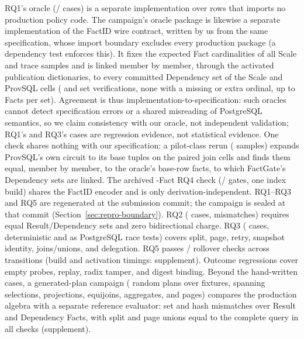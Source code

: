 \documentclass[10pt,journal,compsoc]{IEEEtran}
\newcommand{\system}{FactGate\xspace}
\begin{document}
RQ1's oracle (\RQOnePassed{}/\RQOneCases{} cases) is a separate
implementation over \RQOneRows{} rows that imports no production policy
code. The campaign's oracle package is likewise a separate implementation
of the FactID wire contract, written by us from the same specification,
whose import boundary excludes every production package (a dependency test
enforces this). It fixes the expected Fact cardinalities of all
\FinalVFivePublicationIndependentOracleSamples{} Scale and trace samples
and is linked member by member, through the activated publication
dictionaries, to every committed Dependency set of the Scale and ProvSQL
cells (\FinalVFivePublicationScaleDependencyLinksVerified{} and
\FinalVFivePublicationProvSQLDependencyLinksVerified{} set verifications,
none with a missing or extra ordinal, up to
\FinalVFivePublicationScaleDependencyLinkMaxFacts{} Facts per set).
Agreement is thus implementation-to-specification: such oracles cannot
detect specification errors or a shared misreading of PostgreSQL
semantics, so we claim consistency with our oracle, not independent
validation; RQ1's \RQOneCases{} and RQ3's
\RQThreeCases{} cases are regression evidence, not statistical evidence.
One check shares nothing with our specification: a pilot-class rerun
(\FinalVFiveProvSQLLeafSamples{} samples) expands ProvSQL's own circuit
to its base tuples on the paired join cells and finds them equal, member
by member, to the oracle's \FinalVFiveProvSQLLeafTotalRowFacts{} base-row
facts, to which \system's Dependency sets are linked.
The archived \RQFourVFourOracleFacts{}-Fact RQ4 check
(\RQFourVFourGatesPassed{}/\RQFourVFourGatesTotal{} gates, one index build)
shares the FactID encoder and is only derivation-independent. RQ1--RQ3
and RQ5 are regenerated at the submission commit; the campaign is sealed at
that commit (Section~\ref{sec:repro-boundary}). RQ2
(\RQTwoExposureCases{} cases, \RQTwoExposureMismatches{} mismatches)
requires equal Result/Dependency sets and zero bidirectional charge. RQ3
(\RQThreeCases{} cases, deterministic and as PostgreSQL race tests) covers
split, page, retry, snapshot identity, joins/unions, and delegation.
RQ5 passes \RQFiveChecksPassed{}/\RQFiveChecksTotal{} rollover checks
across \RQFiveTransitions{} transitions (build and activation timings:
supplement). Outcome
regressions cover empty
probes, replay, radix tamper, and digest binding. Beyond the hand-written
cases, a generated-plan campaign (\GeneratedPlans{} random plans over
\GeneratedFixtures{} fixtures, spanning selections, projections,
equijoins, aggregates, and pages) compares the production algebra with a
separate reference evaluator: \GeneratedMismatches{} set and
\GeneratedHashMismatches{} hash mismatches over \GeneratedReleaseFacts{}
Result and \GeneratedDependencyFacts{} Dependency Facts, with split and
page unions equal to the complete query in all \GeneratedSplitChecks{}
checks (supplement).
\end{document}

